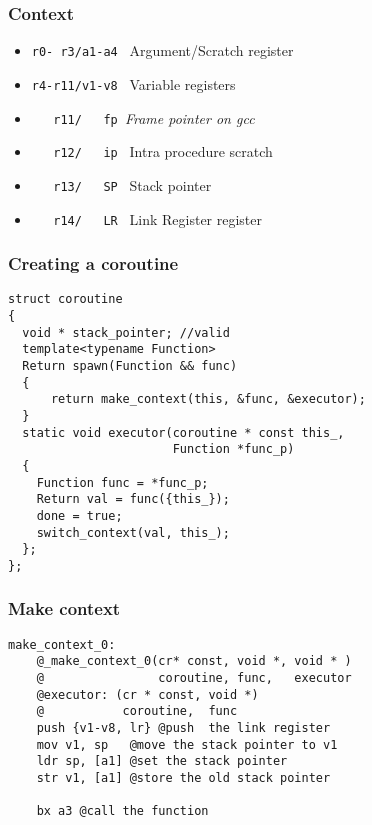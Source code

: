 \documentclass{beamer}
\begin{document}
\begin{frame}[fragile]
\frametitle{Context}
\begin{itemize}
\item<1-> \lstinline[columns=fixed]{r0- r3/a1-a4 } Argument/Scratch register
\item<2-> \lstinline[columns=fixed]{r4-r11/v1-v8 } Variable registers
\item<3-> \lstinline[columns=fixed]{   r11/   fp }\textit{Frame pointer on gcc}
\item<4-> \lstinline[columns=fixed]{   r12/   ip } Intra procedure scratch 
\item<5-> \lstinline[columns=fixed]{   r13/   SP } Stack pointer
\item<6-> \lstinline[columns=fixed]{   r14/   LR } Link Register
register
\end{itemize}
\end{frame}

\begin{frame}[fragile]
\frametitle{Creating a coroutine}
\vspace*{-3ex}

\begin{block}{\vspace*{-3.2ex}}
\begin{lstlisting}[basicstyle=\small]
struct coroutine
{
  void * stack_pointer; //valid
  template<typename Function>
  Return spawn(Function && func)
  {
      return make_context(this, &func, &executor);
  }
  static void executor(coroutine * const this_, 
                       Function *func_p)
  {
    Function func = *func_p;
    Return val = func({this_});
    done = true;
    switch_context(val, this_);
  };  
};
\end{lstlisting}
\end{block}
\end{frame}


\begin{frame}[fragile]
\frametitle{Make context}

\begin{block}{\vspace*{-3.2ex}}
\begin{lstlisting}[language=ASM, basicstyle=\small]
make_context_0:
    @_make_context_0(cr* const, void *, void * )
    @                coroutine, func,   executor
    @executor: (cr * const, void *)
    @           coroutine,  func
    push {v1-v8, lr} @push  the link register
    mov v1, sp   @move the stack pointer to v1
    ldr sp, [a1] @set the stack pointer
    str v1, [a1] @store the old stack pointer

    bx a3 @call the function

\end{lstlisting}
\end{block}
\end{frame}
\end{document}
